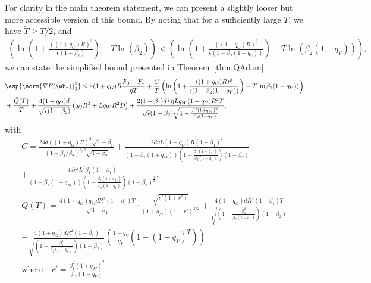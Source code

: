 \documentclass[11pt, letterpaper]{article}
\begin{document}
For clarity in the main theorem statement, we can present a slightly looser but more accessible version of this bound. By noting that for a sufficiently large $T$, we have $\tilde{T} \ge T/2$, and
\begin{align*}
    \left(\ln\left(1 + \frac{((1+q_G)R)^2}{\epsilon( 1- \beta_2)}\right) - T \ln(\beta_2)\right)<\left(\ln\left(1 + \frac{((1+q_G)R)^2}{\epsilon(1-\beta_2(1-q_V))}\right) - T\ln(\beta_2(1-q_V))\right),
\end{align*}
we can state the simplified bound presented in Theorem~\ref{thm:QAdam}:
\begin{align}
    \nonumber
    &\esp{\norm{\nabla F(\wb_{\tau})}_2^2} \leq
    4 (1+q_G)R \frac{F_0 - F_*}{\eta T} 
+ \frac{C}{T}\left(\ln\left(1 + \frac{((1+q_G)R)^2}{\epsilon(1-\beta_2(1-q_V))}\right) - T\ln(\beta_2(1-q_V))\right)\\
    \nonumber
    &+\frac{\tilde{Q}(T)}{T} +\frac{4(1+q_G) d }{\sqrt{\epsilon(1-\beta_2)}} \left( q_G R^3 + L q_W R^2 D \right) + \frac{2(1-\beta_1)d^\frac{3}{2} \eta L q_W(1+q_G)R^2 T}{\sqrt{\epsilon}(1-\beta_2)\sqrt{1-\frac{\beta_1^2(1+q_M)^2}{\beta_2(1-q_V)}}} ,
\end{align}
with
\begin{equation}\label{eq:all_definitions}
\begin{gathered}
    C = \frac{24 d ((1+q_G)R)^2 \sqrt{1-\beta_1}}{(1 - \beta_1 / \beta_2)^{3/2}\sqrt{1 - \beta_2}} + \frac{2d\eta L(1+q_G)R(1-\beta_1)^2}{(1 - \beta_1(1+q_M))(1 - \frac{\beta_1(1+q_M)}{\beta_2(1-q_V)})(1-\beta_2)} \\
    +\frac{4d\eta^2 L^2 \beta_1(1-\beta_1)}{(1 - \beta_1(1+q_M))(1 - \frac{\beta_1(1+q_M)}{\beta_2(1-q_V)})(1-\beta_2)^{\frac{3}{2}}}, \\
    \tilde{Q}(T) = \frac{4(1+q_G)q_M  dR^2(1-\beta_1)T }{\sqrt{1-\beta_2}}\cdot\frac{\sqrt{r'(1+r')}}{(1+q_M)(1-r')^{3/2}} + \frac{4(1+q_G)dR^2(1-\beta_1)T}{\sqrt{(1-\frac{\beta_1^2}{\beta_2(1-q_V)})(1-\beta_2)}}\\
    -\frac{4(1+q_G)dR^2(1-\beta_1)}{\sqrt{(1-\frac{\beta_1^2}{\beta_2(1-q_V)})(1-\beta_2)}} \left( \frac{1-q_V}{q_V}(1-(1-q_V)^T) \right) \\
    \text{where} \quad r' = \frac{\beta_1^2(1+q_M)^2}{\beta_2(1-q_V)}
\end{gathered}
\end{equation}
\end{document}
